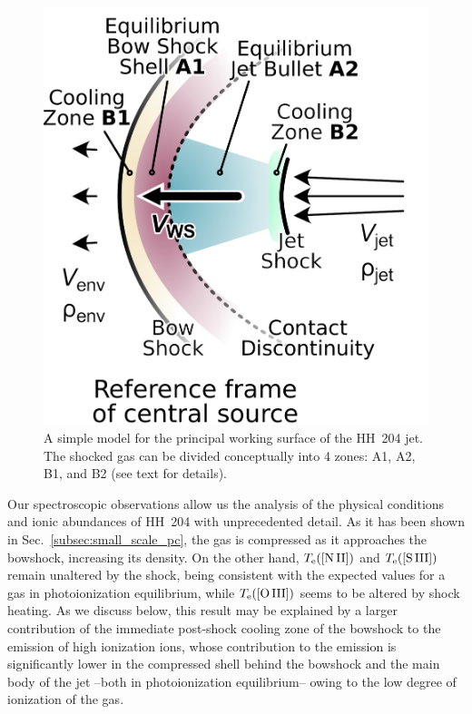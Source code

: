 \documentclass[twocolumn,linenumbers]{aastex63}
\begin{document}
\label{subsubsec:two_temps_model}
\begin{figure}
  \includegraphics[width=\linewidth]{working-surface-hh204-single}
  \caption{
    A simple model for the principal working surface of the HH~204 jet.
    The shocked gas can be divided conceptually into 4 zones:
    A1, A2, B1, and B2 (see text for details).
  }
  \label{fig:working-surface}
\end{figure}

Our spectroscopic observations allow us the analysis of the physical conditions and ionic abundances of HH~204 with unprecedented detail. As it has been shown in Sec.~\ref{subsec:small_scale_pc},  the gas is compressed as it approaches the bowshock, increasing its density. On the other hand, $T_{\rm e}(\text{[N\thinspace II]})$ and $T_{\rm e}(\text{[S\thinspace III]})$ remain unaltered by the shock, being consistent with the expected values for a gas in photoionization equilibrium, while $T_{\rm e}(\text{[O\thinspace III]})$ seems to be altered by shock heating. As we discuss below, this result may be explained by a larger contribution of the immediate post-shock cooling zone of the bowshock to the emission of high ionization ions, whose contribution to the emission is significantly lower in the compressed shell behind the bowshock and the main body of the jet --both in photoionization equilibrium-- owing to the low degree of ionization of the gas. 
\end{document}
